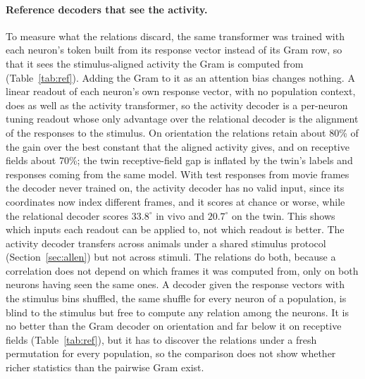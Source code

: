 \documentclass[11pt]{article}
\begin{document}
\paragraph{Reference decoders that see the activity.} To measure what the relations discard, the same transformer was trained with each neuron's token built from its response vector instead of its Gram row, so that it sees the stimulus-aligned activity the Gram is computed from (Table~\ref{tab:ref}). Adding the Gram to it as an attention bias changes nothing. A linear readout of each neuron's own response vector, with no population context, does as well as the activity transformer, so the activity decoder is a per-neuron tuning readout whose only advantage over the relational decoder is the alignment of the responses to the stimulus. On orientation the relations retain about 80\% of the gain over the best constant that the aligned activity gives, and on receptive fields about 70\%; the twin receptive-field gap is inflated by the twin's labels and responses coming from the same model. With test responses from movie frames the decoder never trained on, the activity decoder has no valid input, since its coordinates now index different frames, and it scores at chance or worse, while the relational decoder scores $33.8^\circ$ in vivo and $20.7^\circ$ on the twin. This shows which inputs each readout can be applied to, not which readout is better. The activity decoder transfers across animals under a shared stimulus protocol (Section~\ref{sec:allen}) but not across stimuli. The relations do both, because a correlation does not depend on which frames it was computed from, only on both neurons having seen the same ones. A decoder given the response vectors with the stimulus bins shuffled, the same shuffle for every neuron of a population, is blind to the stimulus but free to compute any relation among the neurons. It is no better than the Gram decoder on orientation and far below it on receptive fields (Table~\ref{tab:ref}), but it has to discover the relations under a fresh permutation for every population, so the comparison does not show whether richer statistics than the pairwise Gram exist.
\end{document}
